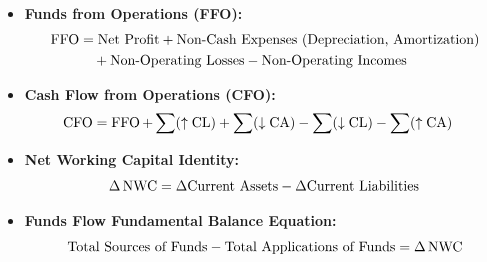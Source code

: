 \begin{formulabox}
\begin{itemize}[leftmargin=*, noitemsep]
    \item \textbf{Funds from Operations (FFO):}
    \begin{align}
        \operatorname{FFO} &= \text{Net Profit} + \text{Non-Cash Expenses (Depreciation, Amortization)} \notag \\
             &\quad + \text{Non-Operating Losses} - \text{Non-Operating Incomes}
    \end{align}

    \item \textbf{Cash Flow from Operations (CFO):}
    \begin{align}
        \operatorname{CFO} &= \operatorname{FFO} + \sum (\uparrow \text{CL}) + \sum (\downarrow \text{CA}) - \sum (\downarrow \text{CL}) - \sum (\uparrow \text{CA})
    \end{align}

    \item \textbf{Net Working Capital Identity:}
    \begin{equation}
        \Delta \operatorname{NWC} = \Delta \text{Current Assets} - \Delta \text{Current Liabilities}
    \end{equation}

    \item \textbf{Funds Flow Fundamental Balance Equation:}
    \begin{equation}
        \text{Total Sources of Funds} - \text{Total Applications of Funds} = \Delta \operatorname{NWC}
    \end{equation}
\end{itemize}
\end{formulabox}

